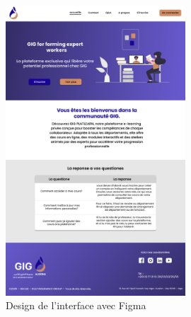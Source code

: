 \documentclass{article}
\begin{document}
\begin{figure}[H]
  \centering
  \includegraphics[width=0.6\textwidth]{homee.png}
  \caption{Design de l'interface avec Figma}
  \end{figure}

  
\end{document}
